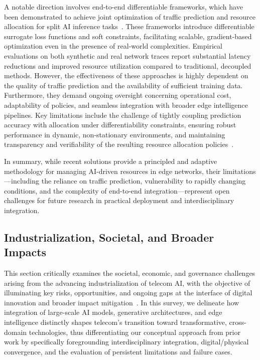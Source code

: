 \documentclass[sigconf]{acmart}
\begin{document}
A notable direction involves end-to-end differentiable frameworks, which have been demonstrated to achieve joint optimization of traffic prediction and resource allocation for split AI inference tasks~\cite{ref48}. These frameworks introduce differentiable surrogate loss functions and soft constraints, facilitating scalable, gradient-based optimization even in the presence of real-world complexities. Empirical evaluations on both synthetic and real network traces report substantial latency reductions and improved resource utilization compared to traditional, decoupled methods. However, the effectiveness of these approaches is highly dependent on the quality of traffic prediction and the availability of sufficient training data. Furthermore, they demand ongoing oversight concerning operational cost, adaptability of policies, and seamless integration with broader edge intelligence pipelines. Key limitations include the challenge of tightly coupling prediction accuracy with allocation under differentiability constraints, ensuring robust performance in dynamic, non-stationary environments, and maintaining transparency and verifiability of the resulting resource allocation policies~\cite{ref48}.

In summary, while recent solutions provide a principled and adaptive methodology for managing AI-driven resources in edge networks, their limitations—including the reliance on traffic prediction, vulnerability to rapidly changing conditions, and the complexity of end-to-end integration—represent open challenges for future research in practical deployment and interdisciplinary integration.

\subsection{Industrialization, Societal, and Broader Impacts}

This section critically examines the societal, economic, and governance challenges arising from the advancing industrialization of telecom AI, with the objective of illuminating key risks, opportunities, and ongoing gaps at the interface of digital innovation and broader impact mitigation~\cite{ref6, ref8, ref19, ref26, ref29, ref49}. In this survey, we delineate how integration of large-scale AI models, generative architectures, and edge intelligence distinctly shapes telecom's transition toward transformative, cross-domain technologies, thus differentiating our conceptual approach from prior work by specifically foregrounding interdisciplinary integration, digital/physical convergence, and the evaluation of persistent limitations and failure cases.
\end{document}
